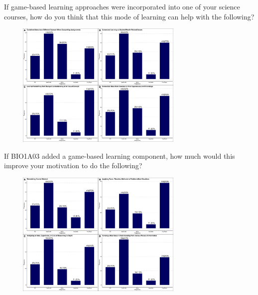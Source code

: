 \documentclass{beamer}
\begin{document}
	\begin{frame}{If game-based learning approaches were incorporated into one of your science courses, how do you think that this mode of learning can help with the following? }
		
		\begin{center}
			\includegraphics[width=10cm, height=6cm]{figures/how_does_gbl_help_in_science.jpg}
		\end{center}
		
	\end{frame}

	\begin{frame}{If BIO1A03 added a game-based learning component, how much would this improve your motivation to do the following? }
		
		\begin{center}
			\includegraphics[width=10cm, height=6cm]{figures/ifbio1a03_added_gblcomponent.jpg}
		\end{center}
		
	\end{frame}
\end{document}
